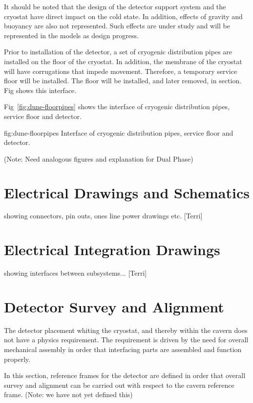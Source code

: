It should be noted that the design of the detector support system and
the cryostat have direct impact on the cold state. In addition,
effects of gravity and buoyancy are also not represented. Such effects
are under study and will be represented in the models as design
progress.

Prior to installation of the detector, a set of cryogenic distribution
pipes are installed on the floor of the cryostat. In addition, the
membrane of the cryostat will have corrugations that impede
movement. Therefore, a temporary service floor will be installed. The
floor will be installed, and later removed, in section. Fig shows this
interface.

Fig~\ref{fig:dune-floorpipes} shows the interface of cryogenic
distribution pipes, service floor and detector.
\begin{dunefigure}{fig:dune-floorpipes} {Interface of cryogenic distribution pipes, service floor and detector.}
\end{dunefigure}


(Note: Need analogous figures and explanation for Dual Phase)


\section{Electrical Drawings and Schematics}
\label{sec:fdsp-coord-electrical}
showing connectors, pin outs, ones line power drawings etc. [Terri]


\section{Electrical Integration Drawings}
\label{sec:fdsp-coord-integ-electrical}
showing interfaces between subsystems... [Terri]


\section{Detector Survey and Alignment}
\label{sec:fdsp-coord-integ-survey}
The detector placement whiting the cryostat, and thereby within the
cavern does not have a physics requirement. The requirement is driven
by the need for overall mechanical assembly in order that interfacing
parts are assembled and function properly.

In this section, reference frames for the detector are defined in order
that overall survey and alignment can be carried out with respect to
the cavern reference frame. (Note: we have not yet defined this)

